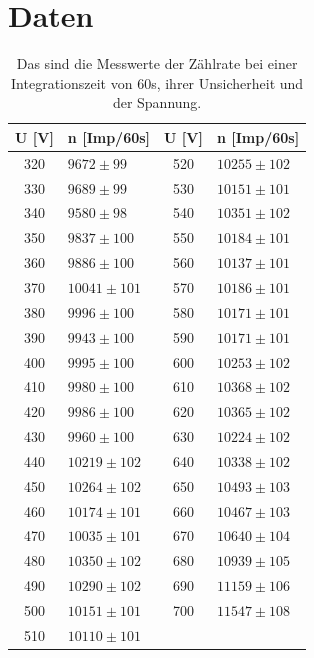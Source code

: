 \documentclass[titlepage = firstcover]{scrartcl}
\begin{document}
    \section{Daten}
    \begin{table}[h]
      \centering
      \caption{Das sind die Messwerte der Zählrate bei einer Integrationszeit von 60s, ihrer Unsicherheit und der Spannung.}
      \label{tab:Kennwerte}
      \begin{tabular}{c l c l}
        \toprule
        U [V] & n [Imp/60s] & U [V] & n [Imp/60s] \\
        \midrule
        320 &	$9672   \pm 99 $ & 520 & $10255  \pm 102$ \\
        330 &	$9689   \pm 99 $ & 530 & $10151  \pm 101$ \\
        340 &	$9580   \pm 98 $ & 540 & $10351  \pm 102$ \\
        350 &	$9837   \pm 100$ & 550 & $10184  \pm 101$ \\
        360 &	$9886   \pm 100$ & 560 & $10137  \pm 101$ \\
        370 &	$10041  \pm 101$ & 570 & $10186  \pm 101$ \\
        380 &	$9996   \pm 100$ & 580 & $10171  \pm 101$ \\
        390 &	$9943   \pm 100$ & 590 & $10171  \pm 101$ \\
        400 &	$9995   \pm 100$ & 600 & $10253  \pm 102$ \\
        410 &	$9980   \pm 100$ & 610 & $10368  \pm 102$ \\
        420 &	$9986   \pm 100$ & 620 & $10365  \pm 102$ \\
        430 &	$9960   \pm 100$ & 630 & $10224  \pm 102$ \\
        440 &	$10219  \pm 102$ & 640 & $10338  \pm 102$ \\
        450 &	$10264  \pm 102$ & 650 & $10493  \pm 103$ \\
        460 &	$10174  \pm 101$ & 660 & $10467  \pm 103$ \\
        470 &	$10035  \pm 101$ & 670 & $10640  \pm 104$ \\
        480 &	$10350  \pm 102$ & 680 & $10939  \pm 105$ \\
        490 &	$10290  \pm 102$ & 690 & $11159  \pm 106$ \\
        500 &	$10151  \pm 101$ & 700 & $11547  \pm 108$ \\
        510 &	$10110  \pm 101$ \\
        \bottomrule
      \end{tabular}
    \end{table}
\end{document}
